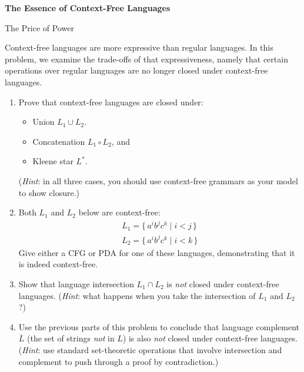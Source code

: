 \documentclass[11pt]{book}
\newcommand{\doctitle}{The Essence of Context-Free Languages}
\begin{document}
\begin{center}
  \large\textbf{{\doctitle}}
\end{center}

\vspace{2em}


\begin{problem}{The Price of Power}

Context-free languages are more expressive than regular languages.  In this
problem, we examine the trade-offs of that expressiveness, namely that certain
operations over regular languages are no longer closed under context-free
languages.

\begin{enumerate}[itemsep=0pt, label=(\alph*)]
  \item Prove that context-free languages are closed under:
    \begin{itemize}
      \item Union $L_1 \cup L_2$.
      \item Concatenation $L_1 \circ L_2$, and
      \item Kleene star $L^*$.
    \end{itemize}
    (\emph{Hint}: in all three cases, you should use context-free grammars
    as your model to show closure.)
  \item Both \( L_1 \) and \( L_2 \) below are context-free:
    \begin{gather*}
      L_1 = \{\, a^i b^j c^k \mid i < j \,\} \\
      L_2 = \{\, a^i b^j c^k \mid i < k \,\}
    \end{gather*}
    Give either a CFG or PDA for one of these languages, demonstrating that it is indeed context-free.
  \item Show that language intersection \( L_1 \cap L_2 \) is \emph{not} closed under context-free languages.
    (\emph{Hint}: what happens when you take the intersection of \( L_1 \) and \( L_2 \)?)
  \item Use the previous parts of this problem to conclude that language complement \( \overline{L} \) (the set of strings \emph{not} in \( L \)) is also \emph{not} closed under context-free languages.
    (\emph{Hint}: use standard set-theoretic operations that involve intersection and complement to push through a proof by contradiction.)
\end{enumerate}

\end{problem}
\end{document}
